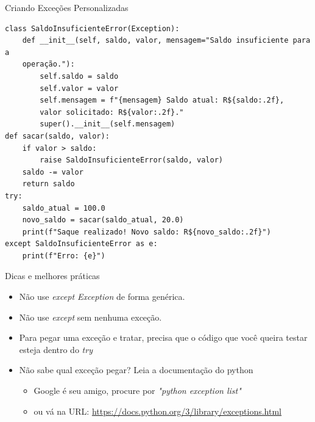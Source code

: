 \begin{frame}[fragile]{Criando Exceções Personalizadas}
    \small
    \begin{verbatim}
class SaldoInsuficienteError(Exception):
    def __init__(self, saldo, valor, mensagem="Saldo insuficiente para a 
    operação."):
        self.saldo = saldo
        self.valor = valor
        self.mensagem = f"{mensagem} Saldo atual: R${saldo:.2f}, 
        valor solicitado: R${valor:.2f}."
        super().__init__(self.mensagem)
def sacar(saldo, valor):
    if valor > saldo:
        raise SaldoInsuficienteError(saldo, valor)
    saldo -= valor
    return saldo
try:
    saldo_atual = 100.0
    novo_saldo = sacar(saldo_atual, 20.0)
    print(f"Saque realizado! Novo saldo: R${novo_saldo:.2f}")
except SaldoInsuficienteError as e:
    print(f"Erro: {e}")

\end{verbatim}

\end{frame}

\begin{frame}{Dicas e melhores práticas}
    \begin{itemize}
        \item Não use \textit{except Exception} de forma genérica.
        \item Não use \textit{except} sem nenhuma exceção.
        \item Para pegar uma exceção e tratar, precisa que o código que você queira testar esteja dentro do \textit{try}
        \item Não sabe qual exceção pegar? Leia a documentação do python
              \begin{itemize}
                  \item Google é seu amigo, procure por \textit{"python exception list"}
                  \item ou vá na URL: \url{https://docs.python.org/3/library/exceptions.html}
              \end{itemize}
    \end{itemize}

\end{frame}
